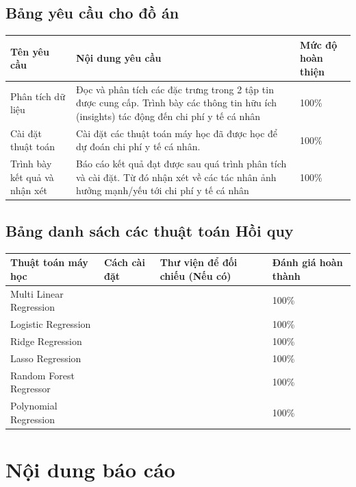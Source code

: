 \documentclass{article}
\newcommand\T{\rule{0pt}{2.6ex}}       %
\newcommand\B{\rule[-1.2ex]{0pt}{0pt}} %
\begin{document}
	\subsection{Bảng yêu cầu cho đồ án}
	\begin{center}
		\begin{tabular}{ | p{5cm} | p{6.5cm} | p{3cm} |}\hline	
			Tên yêu cầu & Nội dung yêu cầu & Mức độ hoàn thiện  \T\B\\\hline
			Phân tích dữ liệu & Đọc và phân tích các đặc trưng trong 2 tập tin được cung cấp. Trình bày các thông tin hữu ích (insights) tác động đến chi phí y tế cá nhân & 100\%  \T\B\\\hline
			Cài đặt thuật toán & Cài đặt các thuật toán máy học đã được học để dự đoán chi phí y tế cá nhân. & 100\%  \T\B\\\hline
			Trình bày kết quả và nhận xét & Báo cáo kết quả đạt được sau quá trình phân tích và cài đặt. Từ đó nhận xét về các tác nhân ảnh hưởng mạnh/yếu tới chi phí y tế cá nhân & 100\%  \T\B\\\hline
		\end{tabular}
	\end{center}	
	\subsection{Bảng danh sách các thuật toán Hồi quy}
	\begin{center}
		\begin{tabular}{ | p{3cm} | p{5cm} | p{3cm} | p{3cm} |} \hline	
			Thuật toán máy học & Cách cài đặt & Thư viện để đối chiếu (Nếu có) & Đánh giá hoàn thành\T\B\\\hline
			Multi Linear Regression & & & 100\%  \T\B\\\hline
			Logistic Regression & & & 100\%  \T\B\\\hline
			Ridge Regression & & & 100\%  \T\B\\\hline
			Lasso Regression & & & 100\%  \T\B\\\hline
			Random Forest Regressor & & & 100\%  \T\B\\\hline
			Polynomial Regression & & & 100\%  \T\B\\\hline
		\end{tabular}
	\end{center}		
	\section{Nội dung báo cáo}
	
\end{document}
